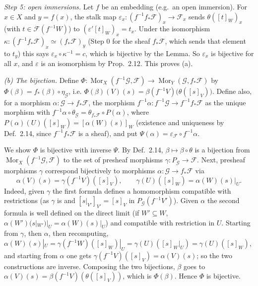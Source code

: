 \documentclass[11pt]{article}
\begin{document}
\emph{Step 5: open immersions.} Let $f$ be an embedding (e.g.\ an open immersion). For $x\in X$ and $y=f(x)$, the stalk map $\varepsilon_x:(f^{-1}f_*\mathcal{F})_x\to\mathcal{F}_x$ sends $\theta([t]_W)_x$ (with $t\in\mathcal{F}(f^{-1}W)$) to $(\varepsilon'[t]_W)_x=t_x$. Under the isomorphism $\kappa:(f^{-1}f_*\mathcal{F})_x\simeq(f_*\mathcal{F})_y$ (Step 0 for the sheaf $f_*\mathcal{F}$, which sends that element to $t_y$) this says $\varepsilon_x\circ\kappa^{-1}=c$, which is bijective by the Lemma. So $\varepsilon_x$ is bijective for all $x$, and $\varepsilon$ is an isomorphism by Prop.~2.12. This proves (a).

\emph{(b) The bijection.} Define $\Phi:\operatorname{Mor}_X(f^{-1}\mathcal{G},\mathcal{F})\to\operatorname{Mor}_Y(\mathcal{G},f_*\mathcal{F})$ by $\Phi(\beta)=f_*(\beta)\circ\eta_{\mathcal{G}}$, i.e. $\Phi(\beta)(V)(s)=\beta(f^{-1}V)\bigl(\theta([s]_V)\bigr)$. Define also, for a morphism $\alpha:\mathcal{G}\to f_*\mathcal{F}$, the morphism $f^{-1}\alpha:f^{-1}\mathcal{G}\to f^{-1}f_*\mathcal{F}$ as the unique morphism with $f^{-1}\alpha\circ\theta_{\mathcal{G}}=\theta_{f_*\mathcal{F}}\circ P(\alpha)$, where $P(\alpha)(U)([s]_W)=[\alpha(W)(s)]_W$ (existence and uniqueness by Def.~2.14, since $f^{-1}f_*\mathcal{F}$ is a sheaf), and put $\Psi(\alpha)=\varepsilon_{\mathcal{F}}\circ f^{-1}\alpha$.

We show $\Phi$ is bijective with inverse $\Psi$. By Def.~2.14, $\beta\mapsto\beta\circ\theta$ is a bijection from $\operatorname{Mor}_X(f^{-1}\mathcal{G},\mathcal{F})$ to the set of presheaf morphisms $\gamma:P_{\mathcal{G}}\to\mathcal{F}$. Next, presheaf morphisms $\gamma$ correspond bijectively to morphisms $\alpha:\mathcal{G}\to f_*\mathcal{F}$ via
\[ \alpha(V)(s)=\gamma(f^{-1}V)([s]_V),\qquad \gamma(U)([s]_W)=\alpha(W)(s)|_U . \]
Indeed, given $\gamma$ the first formula defines a homomorphism compatible with restrictions (as $\gamma$ is and $[s|_{V'}]_{V'}=[s]_V$ in $P_{\mathcal{G}}(f^{-1}V')$). Given $\alpha$ the second formula is well defined on the direct limit (if $W'\subseteq W$, $\alpha(W')(s|_{W'})|_U=\alpha(W)(s)|_U$) and compatible with restriction in $U$. Starting from $\gamma$, then $\alpha$, then recomputing, $\alpha(W)(s)|_U=\gamma(f^{-1}W)([s]_W)|_U=\gamma(U)([s]_W|_U)=\gamma(U)([s]_W)$, and starting from $\alpha$ one gets $\gamma(f^{-1}V)([s]_V)=\alpha(V)(s)$; so the two constructions are inverse. Composing the two bijections, $\beta$ goes to $\alpha(V)(s)=\beta(f^{-1}V)(\theta([s]_V))$, which is $\Phi(\beta)$. Hence $\Phi$ is bijective.
\end{document}
